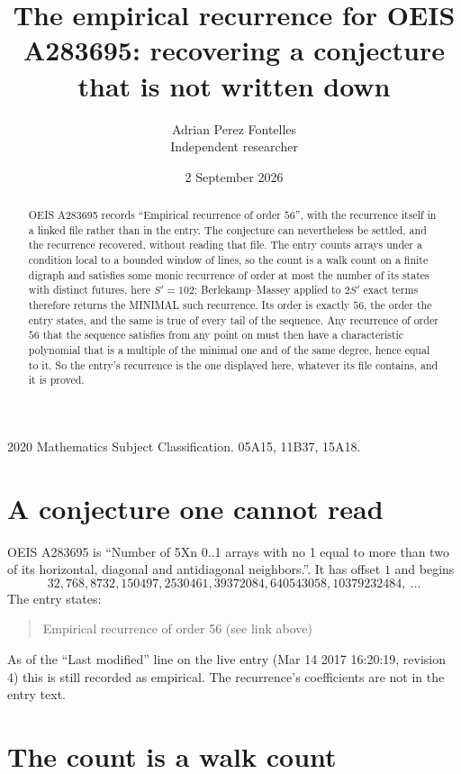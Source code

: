 \documentclass[11pt,a4paper]{article}
\title{The empirical recurrence for OEIS A283695: recovering a conjecture that is not written down}
\author{Adrian Perez Fontelles\\ \small Independent researcher}
\date{2 September 2026}
\theoremstyle{plain}
\theoremstyle{definition}
\begin{document}
\maketitle

\begin{abstract}
OEIS A283695 records ``Empirical recurrence of order $56$'', with the recurrence itself in a
linked file rather than in the entry. The conjecture can nevertheless be settled, and the
recurrence recovered, without reading that file. The entry counts arrays under a condition
local to a bounded window of lines, so the count is a walk count on a finite digraph and
satisfies some monic recurrence of order at most the number of its states with distinct
futures, here $S'=102$; Berlekamp--Massey applied to $2S'$ exact
terms therefore returns the MINIMAL such recurrence. Its order is exactly $56$, the order
the entry states, and the same is true of every tail of the sequence. Any recurrence of order
$56$ that the sequence satisfies from any point on must then have a characteristic
polynomial that is a multiple of the minimal one and of the same degree, hence equal to it. So
the entry's recurrence is the one displayed here, whatever its file contains, and it is
proved.
\end{abstract}

\noindent\small 2020 Mathematics Subject Classification. 05A15, 11B37, 15A18.\normalsize

\section{A conjecture one cannot read}

OEIS A283695 is ``Number of 5Xn 0..1 arrays with no 1 equal to more than two of its horizontal, diagonal and antidiagonal neighbors.''. It has offset $1$ and begins
\[
32, 768, 8732, 150497, 2530461, 39372084, 640543058, 10379232484,\ \dots
\]
The entry states:
\begin{quote}
Empirical recurrence of order 56 (see link above)
\end{quote}
As of the ``Last modified'' line on the live entry (Mar 14 2017 16:20:19, revision 4) this is still
recorded as empirical. The recurrence's coefficients are not in the entry text.

\section{The count is a walk count}
\end{document}
